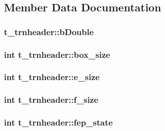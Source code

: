 \subsection{\-Member \-Data \-Documentation}
\hypertarget{structt__trnheader_a1702f44f769ec3e12c74749b9127b8eb}{
\subsubsection[{b\-Double}]{ {\bf t\-\_\-trnheader\-::b\-Double}}}\label{structt__trnheader_a1702f44f769ec3e12c74749b9127b8eb}
\hypertarget{structt__trnheader_a6d1abbf1dc8b73f11a29bd4ceeb265c1}{
\subsubsection[{box\-\_\-size}]{\setlength{\rightskip}{0pt plus 5cm}int {\bf t\-\_\-trnheader\-::box\-\_\-size}}}\label{structt__trnheader_a6d1abbf1dc8b73f11a29bd4ceeb265c1}
\hypertarget{structt__trnheader_a1f2e8d1ef5124dd1fc9aa7c5ceb23304}{
\subsubsection[{e\-\_\-size}]{\setlength{\rightskip}{0pt plus 5cm}int {\bf t\-\_\-trnheader\-::e\-\_\-size}}}\label{structt__trnheader_a1f2e8d1ef5124dd1fc9aa7c5ceb23304}
\hypertarget{structt__trnheader_a7d462f68a0cc0c9dc071d834acf91f77}{
\subsubsection[{f\-\_\-size}]{\setlength{\rightskip}{0pt plus 5cm}int {\bf t\-\_\-trnheader\-::f\-\_\-size}}}\label{structt__trnheader_a7d462f68a0cc0c9dc071d834acf91f77}
\hypertarget{structt__trnheader_a74b199929cbdd302efd05ff9ecf71dd6}{
\subsubsection[{fep\-\_\-state}]{\setlength{\rightskip}{0pt plus 5cm}int {\bf t\-\_\-trnheader\-::fep\-\_\-state}}}\label{structt__trnheader_a74b199929cbdd302efd05ff9ecf71dd6}
